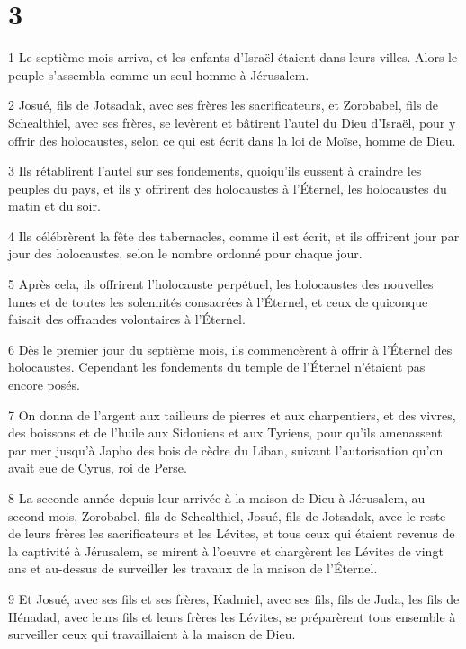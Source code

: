 \chapter{3}

\par 1 Le septième mois arriva, et les enfants d'Israël étaient dans leurs villes. Alors le peuple s'assembla comme un seul homme à Jérusalem.
\par 2 Josué, fils de Jotsadak, avec ses frères les sacrificateurs, et Zorobabel, fils de Schealthiel, avec ses frères, se levèrent et bâtirent l'autel du Dieu d'Israël, pour y offrir des holocaustes, selon ce qui est écrit dans la loi de Moïse, homme de Dieu.
\par 3 Ils rétablirent l'autel sur ses fondements, quoiqu'ils eussent à craindre les peuples du pays, et ils y offrirent des holocaustes à l'Éternel, les holocaustes du matin et du soir.
\par 4 Ils célébrèrent la fête des tabernacles, comme il est écrit, et ils offrirent jour par jour des holocaustes, selon le nombre ordonné pour chaque jour.
\par 5 Après cela, ils offrirent l'holocauste perpétuel, les holocaustes des nouvelles lunes et de toutes les solennités consacrées à l'Éternel, et ceux de quiconque faisait des offrandes volontaires à l'Éternel.
\par 6 Dès le premier jour du septième mois, ils commencèrent à offrir à l'Éternel des holocaustes. Cependant les fondements du temple de l'Éternel n'étaient pas encore posés.
\par 7 On donna de l'argent aux tailleurs de pierres et aux charpentiers, et des vivres, des boissons et de l'huile aux Sidoniens et aux Tyriens, pour qu'ils amenassent par mer jusqu'à Japho des bois de cèdre du Liban, suivant l'autorisation qu'on avait eue de Cyrus, roi de Perse.
\par 8 La seconde année depuis leur arrivée à la maison de Dieu à Jérusalem, au second mois, Zorobabel, fils de Schealthiel, Josué, fils de Jotsadak, avec le reste de leurs frères les sacrificateurs et les Lévites, et tous ceux qui étaient revenus de la captivité à Jérusalem, se mirent à l'oeuvre et chargèrent les Lévites de vingt ans et au-dessus de surveiller les travaux de la maison de l'Éternel.
\par 9 Et Josué, avec ses fils et ses frères, Kadmiel, avec ses fils, fils de Juda, les fils de Hénadad, avec leurs fils et leurs frères les Lévites, se préparèrent tous ensemble à surveiller ceux qui travaillaient à la maison de Dieu.
